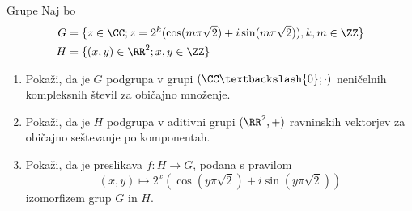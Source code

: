 \begin{frame}{Grupe}
	Naj bo
	\begin{align*}
	 G &= \{z \in \CC; z = 2^k (\cos(m\pi\sqrt{2}) + i \sin(m\pi\sqrt{2})), k, m \in \ZZ\} \\
     H &= \{(x, y ) \in \RR^2; x, y \in \ZZ\}
	\end{align*}
	\begin{enumerate}
		\item
			Pokaži, da je $G$ podgrupa v grupi $(\CC\textbackslash\{0\};\cdot)$
			neničelnih kompleksnih števil za običajno množenje.
		\item
			Pokaži, da je $H$ podgrupa v aditivni grupi $(\RR^2,+)$
			ravninskih vektorjev za običajno seštevanje po komponentah.
		\item
			Pokaži, da je preslikava $f:H\to G$, podana s pravilom
			$$(x,y) \mapsto 2^x (\cos(y\pi\sqrt{2}) + i \sin(y\pi \sqrt{2}))$$
			izomorfizem grup $G$ in $H$.
	\end{enumerate}
\end{frame}


